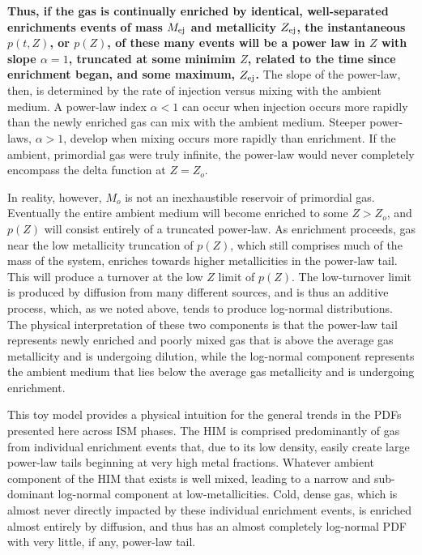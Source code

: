\documentclass[twocolumn]{aastex61}
\begin{document}
\textbf{Thus, if the gas is continually enriched by identical, well-separated enrichments events of mass $M_{\rm ej}$ and metallicity $Z_{\rm ej}$, the instantaneous $p(t,Z)$, or $p(Z)$, of these many events will be a power law in $Z$ with slope $\alpha = 1$, truncated at some minimim $Z$, related to the time since enrichment began, and some maximum, $Z_{\rm ej}$.}
The slope of the power-law, then, is determined by the rate of injection versus mixing with the ambient medium. A power-law index $\alpha < 1$ can occur when injection occurs more rapidly than the newly enriched gas can mix with the ambient medium. Steeper power-laws, $\alpha > 1$, develop when mixing occurs more rapidly than enrichment. If the ambient, primordial gas were truly infinite, the power-law would never completely encompass the delta function at $Z = Z_o$.

In reality, however, $M_o$ is not an inexhaustible reservoir of primordial gas. Eventually the entire ambient medium will become enriched to some $Z > Z_o$, and $p(Z)$ will consist entirely of a truncated power-law. As enrichment proceeds, gas near the low metallicity truncation of $p(Z)$, which still comprises much of the mass of the system, enriches towards higher metallicities in the power-law tail. This will produce a turnover at the low $Z$ limit of $p(Z)$. The low-turnover limit is produced by diffusion from many different sources, and is thus an additive process, which, as we noted above, tends to produce log-normal distributions. The physical interpretation of these two components is that the power-law tail represents newly enriched and poorly mixed gas that is above the average gas metallicity and is undergoing dilution, while the log-normal component represents the ambient medium that lies below the average gas metallicity and is undergoing enrichment.

This toy model provides a physical intuition for the general trends in the PDFs presented here across ISM phases. The HIM is comprised predominantly of gas from individual enrichment events that, due to its low density, easily create large power-law tails beginning at very high metal fractions. Whatever ambient component of the HIM that exists is well mixed, leading to a narrow and sub-dominant log-normal component at low-metallicities. Cold, dense gas, which is almost never directly impacted by these individual enrichment events, is enriched almost entirely by diffusion, and thus has an almost completely log-normal PDF with very little, if any, power-law tail.
\end{document}
